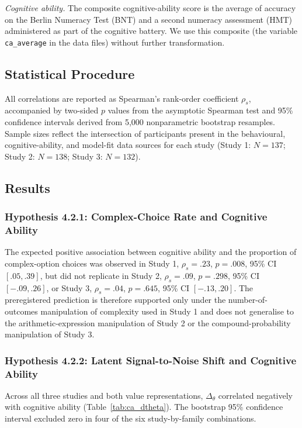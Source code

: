\documentclass[man,floatsintext]{apa7}
\begin{document}
\textit{Cognitive ability.} The composite cognitive-ability score is the average of accuracy on the Berlin Numeracy Test (BNT) and a second numeracy assessment (HMT) administered as part of the cognitive battery. We use this composite (the variable \texttt{ca\_average} in the data files) without further transformation.

\subsection{Statistical Procedure}

All correlations are reported as Spearman's rank-order coefficient $\rho_s$, accompanied by two-sided $p$ values from the asymptotic Spearman test and 95\% confidence intervals derived from 5{,}000 nonparametric bootstrap resamples. Sample sizes reflect the intersection of participants present in the behavioural, cognitive-ability, and model-fit data sources for each study (Study 1: $N = 137$; Study 2: $N = 138$; Study 3: $N = 132$).

\subsection{Results}

\subsubsection{Hypothesis 4.2.1: Complex-Choice Rate and Cognitive Ability}

The expected positive association between cognitive ability and the proportion of complex-option choices was observed in Study 1, $\rho_s = .23$, $p = .008$, 95\% CI $[.05, .39]$, but did not replicate in Study 2, $\rho_s = .09$, $p = .298$, 95\% CI $[-.09, .26]$, or Study 3, $\rho_s = .04$, $p = .645$, 95\% CI $[-.13, .20]$. The preregistered prediction is therefore supported only under the number-of-outcomes manipulation of complexity used in Study 1 and does not generalise to the arithmetic-expression manipulation of Study 2 or the compound-probability manipulation of Study 3.

\subsubsection{Hypothesis 4.2.2: Latent Signal-to-Noise Shift and Cognitive Ability}

Across all three studies and both value representations, $\Delta_\theta$ correlated negatively with cognitive ability (Table~\ref{tab:ca_dtheta}). The bootstrap 95\% confidence interval excluded zero in four of the six study-by-family combinations.
\end{document}
